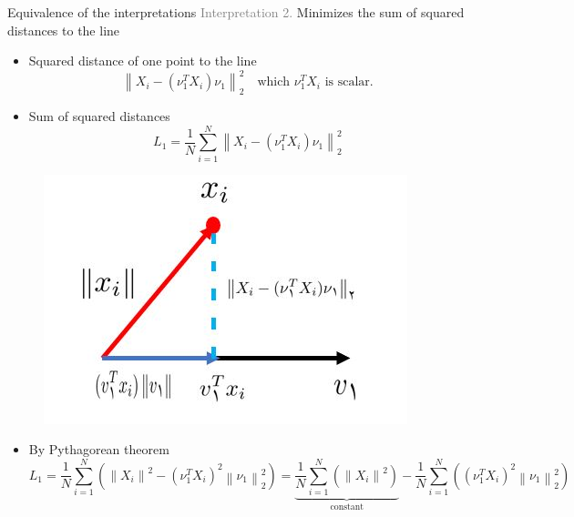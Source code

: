 \documentclass[serif, aspectratio=169]{beamer}
\begin{document}
\begin{frame}{Equivalence of the interpretations}
    \textcolor{gray}{Interpretation 2.} Minimizes the sum of squared distances to the line\\[0.3cm]
    \begin{itemize}
        \item Squared distance of one point to the line $$\left\| X_i - (\nu_1^{T}X_i) \nu_1 \right\|_2^2 \quad \text{which } \nu_1^TX_i \text{ is scalar.}$$
        \item Sum of squared distances $$L_1 = \frac{1}{N} \sum_{i=1}^{N} \left\| X_i - (\nu_1^{T}X_i) \nu_1 \right\|_2^2$$
    \end{itemize}
    \endminipage
    \hfill
    \begin{figure}[htpb]
            \begin{center}
                \includegraphics[keepaspectratio, scale=0.7]{pic/varpic.jpg}
            \end{center}
        \end{figure}
    \endminipage
    \vspace{0.1cm}
    \begin{itemize}
        \item By Pythagorean theorem $$L_1 = \frac{1}{N} \sum_{i=1}^{N} (\left\| X_i \right\|^2 - (\nu_1^{T}X_i)^2 \left\|\nu_1 \right\|_2^2) = \underbrace{\frac{1}{N} \sum_{i=1}^{N} (\left\| X_i \right\|^2)}_{\text{constant}} - \frac{1}{N} \sum_{i=1}^{N} ((\nu_1^{T}X_i)^2 \left\|\nu_1 \right\|_2^2) $$
    \end{itemize}
\end{frame}
\end{document}
